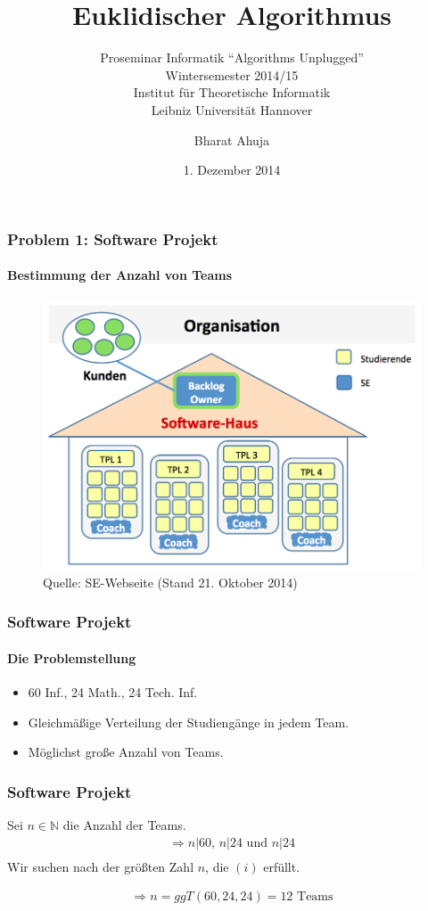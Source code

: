 \documentclass[•]{beamer}
\title{Euklidischer Algorithmus}
\subtitle{Proseminar Informatik ``Algorithms Unplugged''\\
Wintersemester 2014/15\\ 
Institut f\"ur Theoretische Informatik \\
Leibniz Universit\"at Hannover}
\date{1. Dezember 2014}
\author{Bharat Ahuja}
\begin{document}
\maketitle


\begin{frame}
	\frametitle{Problem 1: Software Projekt}
	\framesubtitle{Bestimmung der Anzahl von Teams}
	
	\begin{figure}
	\centering
	\includegraphics[scale=0.20]{Organisation}
	\caption*{\scriptsize{Quelle: SE-Webseite (Stand 21. Oktober 2014)}}
	\end{figure}
	
\end{frame}
	
	
\begin{frame}
	\frametitle{Software Projekt}
	\framesubtitle{Die Problemstellung}
	\begin{itemize}
		\item 60 Inf., 24 Math., 24 Tech. Inf.
		\item Gleichm\"a{\ss}ige Verteilung der Studieng\"ange in jedem Team.
		\item M\"oglichst gro{\ss}e Anzahl von Teams.
		\end{itemize}
\end{frame}

\begin{frame}
	\frametitle{Software Projekt}
	Sei $n \in \mathbb{N}$ die Anzahl der Teams.
	\begin{align*}
	\Rightarrow n|60 \text{, } n|24 \text{ und } n|24 \tag{i}\\
	\end{align*}
	Wir suchen nach der gr\"o{\ss}ten Zahl $n$, die $(i)$ erf\"ullt.
	
	\begin{align*}
	\Rightarrow n = \textit{ggT}(60,24,24) = 12 \text{ Teams}\\
	\end{align*}
	
\end{frame}
\end{document}
